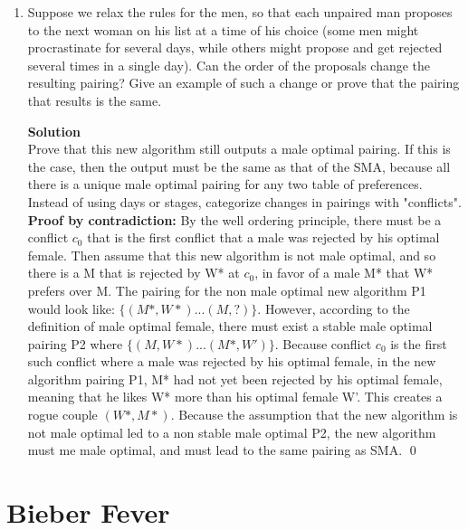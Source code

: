 \documentclass[11pt]{article}
\newcommand*{\Question}[1]{\section{#1}}
\newenvironment{Parts}{\begin{enumerate}[label=(\alph*)]}{\end{enumerate}}
\newcommand*{\Part}{\item}
\begin{document}
\begin{Parts}
\Part Suppose we relax the rules for the men, so that each
unpaired man proposes to the next woman on his list at a 
time of his choice (some men might procrastinate for several
days, while others might propose and get rejected several times
in a single day). Can the order of the proposals change 
the resulting pairing? Give an example of such a change or 
prove that the pairing that results is the same.

\begin{mdframed} \textbf{Solution} \\
Prove that this new algorithm still outputs a male optimal pairing. If this is the case, then the output must be the same as that of the SMA, because all there is a unique male optimal pairing for any two table of preferences. Instead of using days or stages, categorize changes in pairings with "conflicts". \\
\textbf{Proof by contradiction: }By the well ordering principle, there must be a conflict $c_0$ that is the first conflict that a male was rejected by his optimal female. Then assume that this new algorithm is not male optimal, and so there is a M that is rejected by W* at $c_0$, in favor of a male M* that W* prefers over M. The pairing for the non male optimal new algorithm P1 would look like: $\{(M*,W*)...(M,?)\}$. However, according to the definition of male optimal female, there must exist a stable male optimal pairing P2 where $\{(M,W*)...(M*,W')\}$. Because conflict $c_0$ is the first such conflict where a male was rejected by his optimal female, in the new algorithm pairing P1, M* had not yet been rejected by his optimal female, meaning that he likes W* more than his optimal female W'. This creates a rogue couple $(W*,M*)$. Because the assumption that the new algorithm is not male optimal led to a non stable male optimal P2, the new algorithm must me male optimal, and must lead to the same pairing as SMA. \qed  
\end{mdframed}

\end{Parts}



\Question{Bieber Fever}
\end{document}
